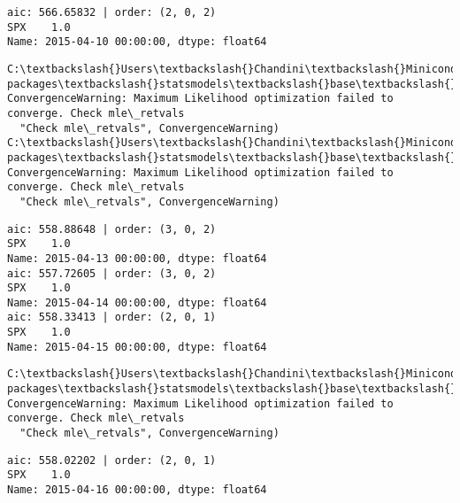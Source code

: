 \documentclass[11pt]{article}
\begin{document}
    \begin{Verbatim}[commandchars=\\\{\}]
aic: 566.65832 | order: (2, 0, 2)
SPX    1.0
Name: 2015-04-10 00:00:00, dtype: float64

    \end{Verbatim}

    \begin{Verbatim}[commandchars=\\\{\}]
C:\textbackslash{}Users\textbackslash{}Chandini\textbackslash{}Miniconda3\textbackslash{}envs\textbackslash{}auquan\textbackslash{}lib\textbackslash{}site-packages\textbackslash{}statsmodels\textbackslash{}base\textbackslash{}model.py:496: ConvergenceWarning: Maximum Likelihood optimization failed to converge. Check mle\_retvals
  "Check mle\_retvals", ConvergenceWarning)
C:\textbackslash{}Users\textbackslash{}Chandini\textbackslash{}Miniconda3\textbackslash{}envs\textbackslash{}auquan\textbackslash{}lib\textbackslash{}site-packages\textbackslash{}statsmodels\textbackslash{}base\textbackslash{}model.py:496: ConvergenceWarning: Maximum Likelihood optimization failed to converge. Check mle\_retvals
  "Check mle\_retvals", ConvergenceWarning)

    \end{Verbatim}

    \begin{Verbatim}[commandchars=\\\{\}]
aic: 558.88648 | order: (3, 0, 2)
SPX    1.0
Name: 2015-04-13 00:00:00, dtype: float64
aic: 557.72605 | order: (3, 0, 2)
SPX    1.0
Name: 2015-04-14 00:00:00, dtype: float64
aic: 558.33413 | order: (2, 0, 1)
SPX    1.0
Name: 2015-04-15 00:00:00, dtype: float64

    \end{Verbatim}

    \begin{Verbatim}[commandchars=\\\{\}]
C:\textbackslash{}Users\textbackslash{}Chandini\textbackslash{}Miniconda3\textbackslash{}envs\textbackslash{}auquan\textbackslash{}lib\textbackslash{}site-packages\textbackslash{}statsmodels\textbackslash{}base\textbackslash{}model.py:496: ConvergenceWarning: Maximum Likelihood optimization failed to converge. Check mle\_retvals
  "Check mle\_retvals", ConvergenceWarning)

    \end{Verbatim}

    \begin{Verbatim}[commandchars=\\\{\}]
aic: 558.02202 | order: (2, 0, 1)
SPX    1.0
Name: 2015-04-16 00:00:00, dtype: float64

    \end{Verbatim}
\end{document}
